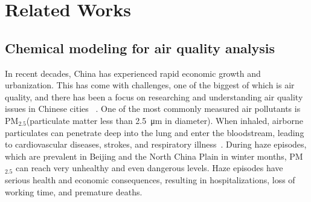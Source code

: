 \section{Related Works}
\label{related_work}
\subsection{Chemical modeling for air quality analysis}
In recent decades, China has experienced rapid economic growth and urbanization. This has come with challenges, one of the biggest of which is air quality, and there has been a focus on researching and understanding air quality issues in Chinese cities ~\cite{ZENG2019329,WANG20122,FANG200979}. One of the most commonly measured air pollutants is PM\(_{2.5}\)(particulate matter less than \SI{2.5}{\micro\meter} in diameter). When inhaled, airborne particulates can penetrate deep into the lung and enter the bloodstream, leading to cardiovascular diseases, strokes, and respiratory illness~\cite{WHO2024}. During haze episodes, which are prevalent in Beijing and the North China Plain in winter months, PM$_{2.5}$ can reach very unhealthy and even dangerous levels. Haze episodes have serious health and economic consequences, resulting in hospitalizations, loss of working time, and premature deaths\cite{WHO2024,Luo2021,JI2012338}.



